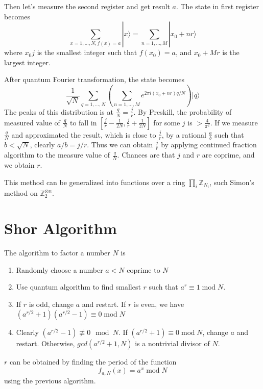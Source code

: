 \documentclass[12pt]{book}
\DeclareMathOperator{\modd}{mod}
\begin{document}
Then let's measure the second register and get result $a$. The state in first register becomes
\begin{equation}
	\sum_{x=1,\dots,N,f(x)=a}|x\rangle=\sum_{n=1,\dots,M}|x_0+nr\rangle
\end{equation}
where $x_0j$ is the smallest integer such that $f(x_0)=a$, and $x_0+Mr$ is the largest integer.

After quantum Fourier transformation, the state becomes
\begin{equation}
	\frac 1{\sqrt{N}}\sum_{q=1,\dots,N}(\sum_{n=1,\dots,M}e^{2\pi i(x_0+nr)q/N})|q\rangle
\end{equation}
The peaks of this distribution is at $\frac q N=\frac j r$. By Preskill, the probability of measured value of $\frac q N$ to fall in $[\frac j r-\frac 1{2N},\frac j r+\frac 1{2N}]$ for some $j$ is $>\frac 4{\pi^2}$. If we measure $\frac q N$ and approximated the result, which is close to $\frac j r$, by a rational $\frac a b$ such that $b<\sqrt N$, clearly $a/b=j/r$. Thus we can obtain $\frac j r$ by applying continued fraction algorithm to the measure value of $\frac q N$. Chances are that $j$ and $r$ are coprime, and we obtain $r$.

This method can be generalized into functions over a ring $\prod_i\mathbb Z_{N_i}$, such Simon's method on $\mathbb Z_2^{\otimes n}$.

\section{Shor Algorithm}

The algorithm to factor a number $N$ is
\begin{enumerate}
	\item Randomly choose a number $a<N$ coprime to $N$
	\item Use quantum algorithm to find smallest $r$ such that $a^r\equiv 1 \modd N$.
	\item If $r$ is odd, change $a$ and restart. If $r$ is even, we have $(a^{r/2}+1)(a^{r/2}-1)\equiv 0 \modd N$
	\item Clearly $(a^{r/2}-1)\not\equiv 0 \mod N$. If $(a^{r/2}+1)\equiv 0 \modd N$, change $a$ and restart. Otherwise, $gcd(a^{r/2}+1,N)$ is a nontrivial divisor of $N$.
\end{enumerate}

$r$ can be obtained by finding the period of the function
\begin{equation}
	f_{a,N}(x)=a^x \modd N
\end{equation}
using the previous algorithm. 
\end{document}
